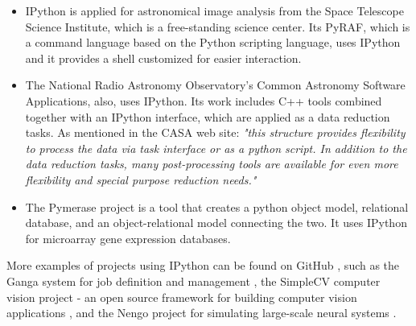 \begin{itemize}
\item IPython is applied for astronomical image analysis from the Space Telescope Science Institute, which is a free-standing science center. Its PyRAF, which is a command language based on the Python scripting language, uses IPython and it provides a shell customized for easier interaction. \cite{pyRaf}

\item The National Radio Astronomy Observatory’s Common Astronomy Software Applications, also, uses IPython. Its work includes C++ tools combined together with an IPython interface, which are applied as a data reduction tasks.\cite{casa} As mentioned in the CASA web site: \textit{"this structure provides flexibility to process the data via task interface or as a python script. In addition to the data reduction tasks, many post-processing tools are available for even more flexibility and special purpose reduction needs."}\cite{casa}

\item The Pymerase project is a tool that creates a python object model, relational database, and an object-relational model connecting the two. It uses IPython for microarray gene expression databases.\cite{pymerase}

\end{itemize}

More examples of projects using IPython can be found on GitHub \cite{gitHubAlliPython}, such as the Ganga system for job definition and management \cite{ganga}, the SimpleCV computer vision project - an open source framework for building computer vision applications \cite{simpleCV}, and the Nengo project for simulating large-scale neural systems \cite{nengo}.






